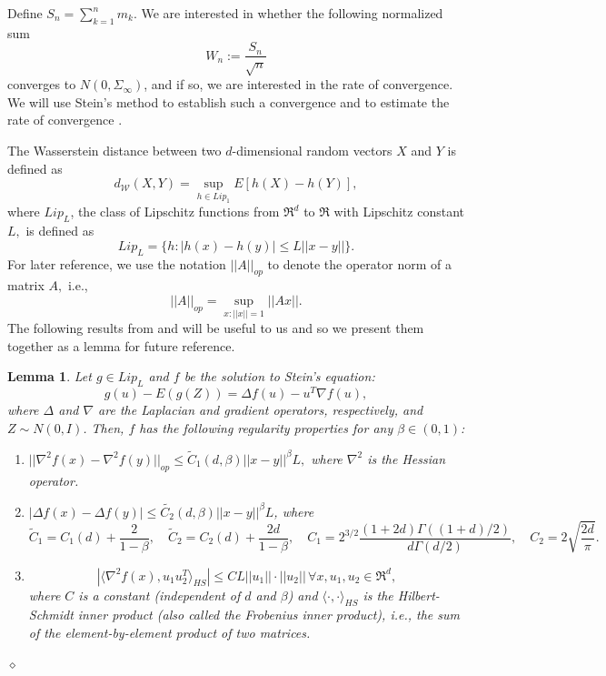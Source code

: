 \documentclass[11pt]{article}
\newtheorem{lemma}{Lemma}
\begin{document}
Define
$S_n=\sum_{k=1}^n m_k.$ We are interested in whether the following normalized sum 
\begin{equation}\label{eq: normalized sum}
W_n:=\frac{S_n}{\sqrt{n}}
\end{equation}
converges to $N(0,\Sigma_\infty)$, and if so, we are interested in the rate of convergence. We will use Stein's method to establish such a convergence and to estimate the rate of convergence \citep{stein1972bound,ross2011fundamentals,chatterjee2014short}. 

The Wasserstein distance between two $d$-dimensional random vectors $X$ and $Y$ is defined as
$$d_{\mathcal{W}}(X,Y)=\sup_{h\in Lip_1} E[h(X)-h(Y)],$$
where $Lip_L$, the class of Lipschitz functions from $\Re^d$ to $\Re$  with Lipschitz constant $L,$ is defined as
$$Lip_L=\{h: |h(x)-h(y)|\leq L||x-y||\}.$$
For later reference, we use the notation $||A||_{op}$  to denote the operator norm of a matrix $A,$ i.e., $$||A||_{op}=\sup_{x: ||x||=1}||Ax||.$$
The following results from \cite[Propositions 2.2 and 2.3]{gallouet2018regularity} and \cite[Theorem 3.1]{fang2019multivariate} will be useful to us and so we present them together as a lemma for future reference.
\begin{lemma}\label{lem: regularity}
Let $g\in Lip_L$ and $f$ be the solution to Stein's equation:
\begin{equation}\label{eq: Stein}
    g(u)-E(g(Z))=\Delta f(u)-u^T\nabla f(u),
\end{equation}
where $\Delta$ and $\nabla$ are the Laplacian and gradient operators, respectively, and $Z\sim N(0,I)$. Then, $f$ has the following regularity properties for any $\beta\in (0,1)$:
\begin{enumerate}
    \item $||\nabla^2f(x)-\nabla^2f(y)||_{op}\leq \tilde{C}_1(d,\beta)||x-y||^\beta L,$ where $\nabla^2$ is the Hessian operator.
    \item $|\Delta f(x)-\Delta f(y)|\leq \tilde{C_2}(d,\beta)||x-y||^\beta L$,
where  $$\tilde{C}_1=C_1(d)+\frac{2}{1-\beta}, \quad \tilde{C}_2=C_2(d)+\frac{2d}{1-\beta}, \quad 
C_1=2^{3/2}\frac{(1+2d)\Gamma((1+d)/2)}{d\Gamma(d/2)},\quad C_2=2\sqrt{\frac{2d}{\pi}}.$$
    \item  $$\left|\langle\nabla^2 f(x),u_1u_2^T\rangle_{HS}\right|\leq C L||u_1||\cdot||u_2||\,\forall x, u_1, u_2\in \Re^d,$$ where $C$ is a constant (independent of $d$ and $\beta$) and $\langle\cdot,\cdot\rangle_{HS}$ is the Hilbert-Schmidt inner product (also called the Frobenius inner product), i.e., the sum of the element-by-element product of two matrices.
\end{enumerate}
\hfill $\diamond$
\end{lemma}
\end{document}
